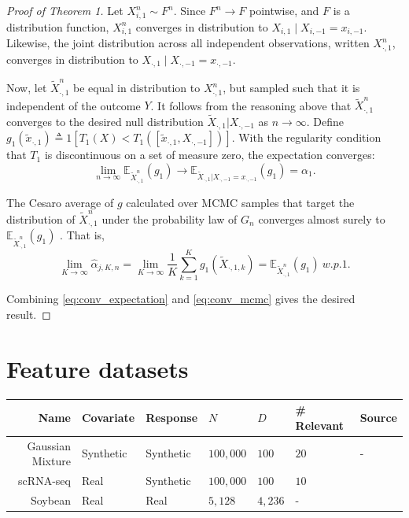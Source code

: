\documentclass{article}
\begin{document}
\begin{proof}[Proof of Theorem 1]
Let $X_{i, 1}^n \sim F^n$.
Since $F^{n} \to F$ pointwise, and $F$ is a distribution function,
\(X_{i, 1}^{n}\)
converges in distribution to
\(X_{i, 1} \mid X_{i,-1} = x_{i, -1}\).
Likewise, the joint distribution across all independent observations, written $X_{\cdot, 1}^n$, converges in distribution to $X_{\cdot, 1} \mid X_{\cdot, -1} = x_{\cdot, -1}$.

Now, let $\tilde X^n_{\cdot, 1}$ be equal in distribution to $ X^n_{\cdot, 1}$, but sampled such that it is independent of the outcome $Y$.
It follows from the reasoning above that $\tilde X^n_{\cdot, 1}$ converges to the desired null distribution $\tilde X_{\cdot, 1} \vert X_{\cdot, -1}$ as $n \to \infty$.
Define $g_{1} (\tilde x_{\cdot, 1}) \triangleq 1[T_{1}(X) < T_{1}([\tilde x_{\cdot, 1}, X_{\cdot, -1}])]$.
With the regularity condition that $T_1$ is discontinuous on a set of measure zero,
the expectation converges:
\begin{equation} \label{eq:conv_expectation}
 \lim_{n \to \infty}\mathbb E_{\tilde X_{\cdot, 1}^{n}} (g_{1}) \to \mathbb E_{\tilde X_{\cdot, 1} \vert X_{\cdot, -1} = x_{\cdot, -1}} (g_{1}) = \alpha_{1}.
\end{equation}

The Cesaro average of $g$ calculated over MCMC samples that target the distribution of $\tilde X_{\cdot, 1}^n$ under the probability law of $G_n$ converges almost surely to $\mathbb E_{\tilde X_{\cdot, 1}^{n}}(g_{1})$
\citep{smithBayesianComputationGibbs1993}. That is,
\begin{equation} \label{eq:conv_mcmc}
   \lim_{K \to \infty} \hat \alpha_{j, K, n}= \lim_{K \to \infty} \frac {1}{K} \sum_{k=1}^{K} g_{1}(\tilde X_{\cdot, 1, k}) = \mathbb E_{\tilde X_{\cdot, 1}^{n} }(g_{1}) ~w.p.1.
 \end{equation}

Combining \cref{eq:conv_expectation} and \cref{eq:conv_mcmc} gives the desired result.
\end{proof}
 \newpage

\section{Feature datasets}

\begin{tabular}{rllllll}
  Name & Covariate & Response & $N$ & $D$ & \# Relevant & Source \\
  \midrule
  Gaussian Mixture & Synthetic & Synthetic & $100,000$ & $100$ & $20$ & -\\
  scRNA-seq & Real & Synthetic & $100,000$ & $100$ & $10$ &  \citet{rnasq_tenx}\\
  Soybean & Real & Real & $5,128$ & $4,236$ & - & \citet{soynam} \\
\end{tabular}
\end{document}
